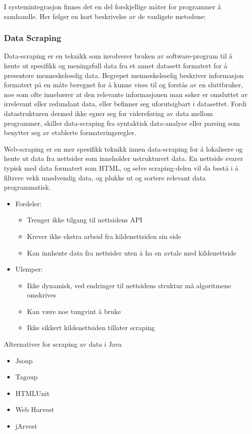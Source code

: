 \documentclass[../main.tex]{subfiles}
\begin{document}
I systemintegrasjon finnes det en del forskjellige måter for programmer å samhandle. Her følger en kort beskrivelse av de vanligste metodene:

\subsubsection{Data Scraping}
Data-scraping er en teknikk som involverer bruken av software-program til å hente ut spesifikk og meningsfull data fra et annet datasett formatert for å presentere menneskeleselig data. Begrepet menneskeleselig beskriver informasjon formatert på en måte beregnet for å kunne vises til og forstås av en sluttbruker, noe som ofte innebærer at den relevante informasjonen man søker er omsluttet av irrelevant eller redundant data, eller befinner seg uforutsigbart i datasettet. Fordi datastrukturen dermed ikke egner seg for videreføring av data mellom programmer, skiller data-scraping fra syntaktisk data-analyse eller parsing som benytter seg av etablerte formateringsregler. 

Web-scraping er en mer spesifikk teknikk innen data-scraping for å lokalisere og hente ut data fra nettsider som inneholder ustrukturert data. En nettside svarer typisk med data formatert som HTML, og selve scraping-delen vil da bestå i å filtrere vekk unødvendig data, og plukke ut og sortere relevant data programmatisk.

\begin{itemize}
\item Fordeler:
	\begin{itemize}
	\item Trenger ikke tilgang til nettsidens API
	\item Krever ikke ekstra arbeid fra kildenettsiden sin side
	\item Kan innhente data fra nettsider uten å ha en avtale med kildenettside
	\end{itemize}
\item Ulemper:
	\begin{itemize}
	\item Ikke dynamisk, ved endringer til nettsidens struktur må algoritmene omskrives
	\item Kan være noe tungvint å bruke
	\item Ikke sikkert kildenettsiden tillater scraping
	\end{itemize}
\end{itemize}

Alternativer for scraping av data i Java
\begin{itemize}
\item Jsoup 
\item Tagoup 
\item HTMLUnit 
\item Web Harvest 
\item jArvest 
\end{itemize}
\end{document}

